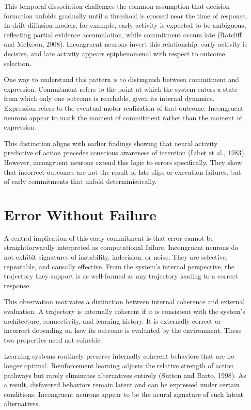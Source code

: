 \documentclass[11pt]{article}
\begin{document}
This temporal dissociation challenges the common assumption that decision formation unfolds gradually until a threshold is crossed near the time of response. In drift-diffusion models, for example, early activity is expected to be ambiguous, reflecting partial evidence accumulation, while commitment occurs late (Ratcliff and McKoon, 2008). Incongruent neurons invert this relationship: early activity is decisive, and late activity appears epiphenomenal with respect to outcome selection.

One way to understand this pattern is to distinguish between commitment and expression. Commitment refers to the point at which the system enters a state from which only one outcome is reachable, given its internal dynamics. Expression refers to the eventual motor realization of that outcome. Incongruent neurons appear to mark the moment of commitment rather than the moment of expression.

This distinction aligns with earlier findings showing that neural activity predictive of action precedes conscious awareness of intention (Libet et al., 1983). However, incongruent neurons extend this logic to errors specifically. They show that incorrect outcomes are not the result of late slips or execution failures, but of early commitments that unfold deterministically.

\section{Error Without Failure}

A central implication of this early commitment is that error cannot be straightforwardly interpreted as computational failure. Incongruent neurons do not exhibit signatures of instability, indecision, or noise. They are selective, repeatable, and causally effective. From the system’s internal perspective, the trajectory they support is as well-formed as any trajectory leading to a correct response.

This observation motivates a distinction between internal coherence and external evaluation. A trajectory is internally coherent if it is consistent with the system’s architecture, connectivity, and learning history. It is externally correct or incorrect depending on how its outcome is evaluated by the environment. These two properties need not coincide.

Learning systems routinely preserve internally coherent behaviors that are no longer optimal. Reinforcement learning adjusts the relative strength of action pathways but rarely eliminates alternatives entirely (Sutton and Barto, 1998). As a result, disfavored behaviors remain latent and can be expressed under certain conditions. Incongruent neurons appear to be the neural signature of such latent alternatives.
\end{document}
